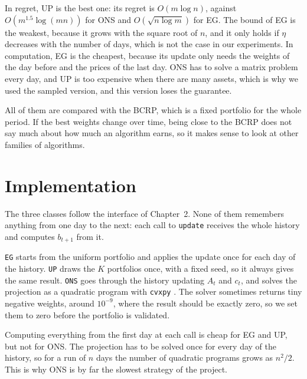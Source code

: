 In regret, UP is the best one: its regret is $O(m\log n)$, against $O(m^{1.5}\log(mn))$
for ONS and $O(\sqrt{n\log m})$ for EG. The bound of EG is the weakest, because it grows
with the square root of $n$, and it only holds if $\eta$ decreases with the number of days,
which is not the case in our experiments. In computation, EG is the cheapest, because its
update only needs the weights of the day before and the prices of the last day. ONS has to
solve a matrix problem every day, and UP is too expensive when there are many assets, which
is why we used the sampled version, and this version loses the guarantee.

All of them are compared with the BCRP, which is a fixed portfolio for the whole period. If
the best weights change over time, being close to the BCRP does not say much about how much
an algorithm earns, so it makes sense to look at other families of algorithms.

\section{Implementation}

The three classes follow the interface of Chapter~2. None of them remembers anything from
one day to the next: each call to \texttt{update} receives the whole history and computes
$b_{t+1}$ from it.

\texttt{EG} starts from the uniform portfolio and applies the update once for each day of
the history. \texttt{UP} draws the $K$ portfolios once, with a fixed seed, so it always
gives the same result. \texttt{ONS} goes through the history updating $A_t$ and $c_t$, and
solves the projection as a quadratic program with \texttt{cvxpy}
\parencite{diamond16,agrawal18}. The solver sometimes
returns tiny negative weights, around $10^{-9}$, where the result should be exactly zero,
so we set them to zero before the portfolio is validated.

Computing everything from the first day at each call is cheap for EG and UP, but not for
ONS. The projection has to be solved once for every day of the history, so for a run of
$n$ days the number of quadratic programs grows as $n^2/2$. This is why ONS is by far the
slowest strategy of the project.
